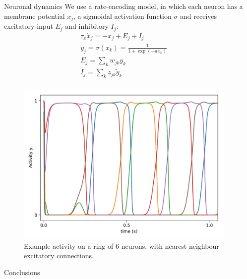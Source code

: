 \documentclass[final,hyperref={pdfpagelabels=false}]{beamer}
\begin{document}
\begin{frame}
\begin{columns}
\begin{column}{.30\textwidth}
\begin{minipage}[T]{.95\textwidth}
{						\vfill
						\begin{block}{Neuronal dynamics}
							We use a rate-encoding model, in which each neuron has a membrane potential $x_j$, a sigmoidal activation function $\sigma$ and receives excitatory input $E_j$ and inhibitory $I_j$:
							\begin{gather*}
								\tau_x \dot{x}_j = -x_j + E_j + I_j\\
								y_j = \sigma \left(x_k\right) = \frac{1}{1+\exp \left(-a x_k \right) } \\
								E_j = \sum_{k} w_{jk} y_k \\
								I_j = \sum_k z_{jk} \tilde{y}_k \\
								\label{eq:neuron}
							\end{gather*}
							\begin{figure}
								\includegraphics[width=.8\linewidth]{ring_activity2}
								\caption{Example activity on a ring of 6 neurons, with nearest neighbour excitatory connections.}
							\end{figure}
							
						\end{block}
						
						
						
						\vfill
						\begin{emphblock}{Conclusions}
						\end{emphblock}

					 } %
				\end{minipage}
		\end{column}
		\begin{column}{.64\textwidth}
				\begin{minipage}[T]{.95\textwidth}
					\parbox[t][\columnheight]{\textwidth}{

}
\end{minipage}
\end{column}
\end{columns}
\end{frame}
\end{document}

